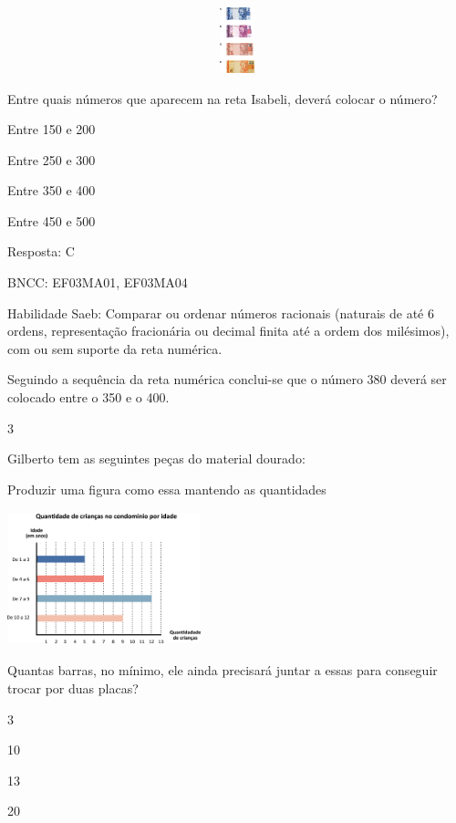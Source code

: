 \begin{escolha}
\includegraphics[width=5.90556in,height=0.74931in]{media/image117.png}

Entre quais números que aparecem na reta Isabeli, deverá colocar o
número?

\begin{escolha}
\item
  Entre 150 e 200
\item
  Entre 250 e 300
\item
  Entre 350 e 400
\item
  Entre 450 e 500
\end{escolha}

Resposta: C

BNCC: EF03MA01, EF03MA04

Habilidade Saeb: Comparar ou ordenar números racionais (naturais de até
6 ordens, representação fracionária ou decimal finita até a ordem dos
milésimos), com ou sem suporte da reta numérica.

Seguindo a sequência da reta numérica conclui-se que o número 380 deverá
ser colocado entre o 350 e o 400.

\num{3}

Gilberto tem as seguintes peças do material dourado:

Produzir uma figura como essa mantendo as quantidades

\includegraphics[width=2.20852in,height=1.52513in]{media/image118.png}

Quantas barras, no mínimo, ele ainda precisará juntar a essas para
conseguir trocar por duas placas?

\begin{escolha}
\item
  3
\item
  10
\item
  13
\item
  20
\end{escolha}


\end{escolha}
